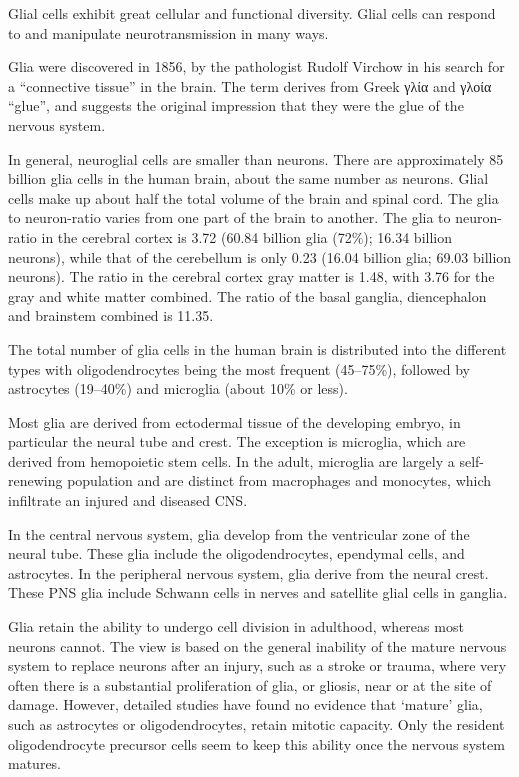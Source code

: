 \documentclass[]{book}
\begin{document}
Glial cells exhibit great cellular and functional diversity. Glial cells can respond to and manipulate neurotransmission in many ways.

Glia were discovered in 1856, by the pathologist Rudolf Virchow in his search for a ``connective tissue'' in the brain. The term derives from Greek γλία and γλοία ``glue'', and suggests the original impression that they were the glue of the nervous system.

In general, neuroglial cells are smaller than neurons. There are approximately 85 billion glia cells in the human brain, about the same number as neurons. Glial cells make up about half the total volume of the brain and spinal cord. The glia to neuron-ratio varies from one part of the brain to another. The glia to neuron-ratio in the cerebral cortex is 3.72 (60.84 billion glia (72\%); 16.34 billion neurons), while that of the cerebellum is only 0.23 (16.04 billion glia; 69.03 billion neurons). The ratio in the cerebral cortex gray matter is 1.48, with 3.76 for the gray and white matter combined. The ratio of the basal ganglia, diencephalon and brainstem combined is 11.35.

The total number of glia cells in the human brain is distributed into the different types with oligodendrocytes being the most frequent (45--75\%), followed by astrocytes (19--40\%) and microglia (about 10\% or less).

Most glia are derived from ectodermal tissue of the developing embryo, in particular the neural tube and crest. The exception is microglia, which are derived from hemopoietic stem cells. In the adult, microglia are largely a self-renewing population and are distinct from macrophages and monocytes, which infiltrate an injured and diseased CNS.

In the central nervous system, glia develop from the ventricular zone of the neural tube. These glia include the oligodendrocytes, ependymal cells, and astrocytes. In the peripheral nervous system, glia derive from the neural crest. These PNS glia include Schwann cells in nerves and satellite glial cells in ganglia.

Glia retain the ability to undergo cell division in adulthood, whereas most neurons cannot. The view is based on the general inability of the mature nervous system to replace neurons after an injury, such as a stroke or trauma, where very often there is a substantial proliferation of glia, or gliosis, near or at the site of damage. However, detailed studies have found no evidence that `mature' glia, such as astrocytes or oligodendrocytes, retain mitotic capacity. Only the resident oligodendrocyte precursor cells seem to keep this ability once the nervous system matures.
\end{document}
